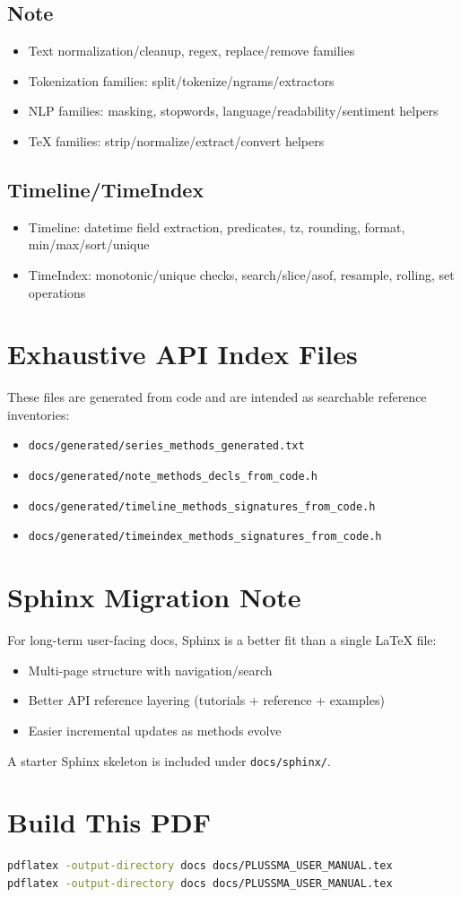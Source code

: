 \documentclass[11pt]{article}
\begin{document}
\subsection{Note}
\begin{itemize}[leftmargin=1.5em]
  \item Text normalization/cleanup, regex, replace/remove families
  \item Tokenization families: split/tokenize/ngrams/extractors
  \item NLP families: masking, stopwords, language/readability/sentiment helpers
  \item TeX families: strip/normalize/extract/convert helpers
\end{itemize}

\subsection{Timeline/TimeIndex}
\begin{itemize}[leftmargin=1.5em]
  \item Timeline: datetime field extraction, predicates, tz, rounding, format, min/max/sort/unique
  \item TimeIndex: monotonic/unique checks, search/slice/asof, resample, rolling, set operations
\end{itemize}

\section{Exhaustive API Index Files}
\label{sec:api-index-files}
These files are generated from code and are intended as searchable reference inventories:
\begin{itemize}[leftmargin=1.5em]
  \item \texttt{docs/generated/series\_methods\_generated.txt}
  \item \texttt{docs/generated/note\_methods\_decls\_from\_code.h}
  \item \texttt{docs/generated/timeline\_methods\_signatures\_from\_code.h}
  \item \texttt{docs/generated/timeindex\_methods\_signatures\_from\_code.h}
\end{itemize}

\section{Sphinx Migration Note}
For long-term user-facing docs, Sphinx is a better fit than a single LaTeX file:
\begin{itemize}[leftmargin=1.5em]
  \item Multi-page structure with navigation/search
  \item Better API reference layering (tutorials + reference + examples)
  \item Easier incremental updates as methods evolve
\end{itemize}
A starter Sphinx skeleton is included under \texttt{docs/sphinx/}.

\section{Build This PDF}
\begin{lstlisting}[language=bash]
pdflatex -output-directory docs docs/PLUSSMA_USER_MANUAL.tex
pdflatex -output-directory docs docs/PLUSSMA_USER_MANUAL.tex
\end{lstlisting}
\end{document}
